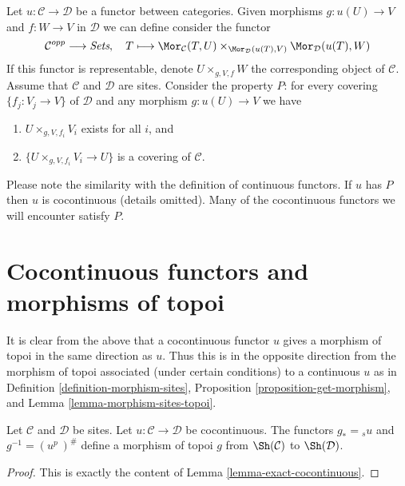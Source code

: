 \begin{remark}
\label{remark-cartesian-cocontinuous}
Let $u : \mathcal{C} \to \mathcal{D}$ be a functor between categories.
Given morphisms $g : u(U) \to V$ and $f : W \to V$ in $\mathcal{D}$
we can define consider the functor
$$
\mathcal{C}^{opp} \longrightarrow \textit{Sets},\quad
T \longmapsto
\Mor_\mathcal{C}(T, U)
\times_{\Mor_\mathcal{D}(u(T), V)}
\Mor_\mathcal{D}(u(T), W)
$$
If this functor is representable, denote $U \times_{g, V, f} W$
the corresponding object of $\mathcal{C}$.
Assume that $\mathcal{C}$ and $\mathcal{D}$ are sites.
Consider the property $P$: for every covering $\{f_j : V_j \to V\}$
of $\mathcal{D}$ and any morphism $g : u(U) \to V$ we have
\begin{enumerate}
\item $U \times_{g, V, f_i} V_i$ exists for all $i$, and
\item $\{U \times_{g, V, f_i} V_i \to U\}$ is a covering of $\mathcal{C}$.
\end{enumerate}
Please note the similarity with the definition of continuous
functors. If $u$ has $P$ then $u$ is cocontinuous (details omitted).
Many of the cocontinuous functors we will encounter satisfy $P$.
\end{remark}


\section{Cocontinuous functors and morphisms of topoi}
\label{section-cocontinuous-morphism-topoi}

\noindent
It is clear from the above that a cocontinuous functor $u$
gives a morphism of topoi in the same direction as $u$.
Thus this is in the opposite direction from the morphism of topoi
associated (under certain conditions) to a continuous $u$ as in
Definition \ref{definition-morphism-sites},
Proposition \ref{proposition-get-morphism}, and
Lemma \ref{lemma-morphism-sites-topoi}.

\begin{lemma}
\label{lemma-cocontinuous-morphism-topoi}
Let $\mathcal{C}$ and $\mathcal{D}$ be sites.
Let $u : \mathcal{C} \to \mathcal{D}$ be cocontinuous.
The functors $g_* = {}_su$ and $g^{-1} = (u^p\ )^\#$
define a morphism of topoi
$g$ from  $\Sh(\mathcal{C})$ to $\Sh(\mathcal{D})$.
\end{lemma}

\begin{proof}
This is exactly the content of Lemma \ref{lemma-exact-cocontinuous}.
\end{proof}


